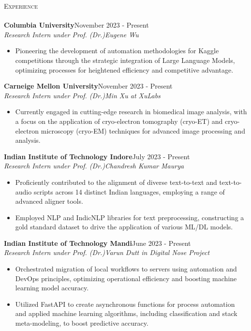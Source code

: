 \documentclass[a4paper]{article}
\newcommand{\lineunder} {
    \vspace*{-8pt} \\
    \hspace*{-18pt} \hrulefill \\
}
\newcommand{\header} [1] {
    {\hspace*{-18pt}\vspace*{6pt} \textsc{#1}}
    \vspace*{-6pt} \lineunder
}
\begin{document}
\header{Experience}
\vspace{-1mm}
{\textbf{Columbia University}}\hfill November 2023 - Present \\
 {\textit{Research Intern under Prof. (Dr.)Eugene Wu }}  \
\vspace{-2mm}
\begin{itemize} 
\item Pioneering the development of automation methodologies for Kaggle competitions through the strategic integration of Large Language Models, optimizing processes for heightened efficiency and competitive advantage.
\end{itemize}
\vspace{-1.5mm}
{\textbf{Carneige Mellon University}}\hfill November 2023 - Present \\
 {\textit{Research Intern under Prof. (Dr.)Min Xu at XuLabs}}  \
\vspace{-2mm}
\begin{itemize} 
\item Currently engaged in cutting-edge research in biomedical image analysis, with a focus on the application of cryo-electron tomography (cryo-ET) and cryo-electron microscopy (cryo-EM) techniques for advanced image processing and analysis.
\end{itemize}
\vspace{-2mm}
{\textbf{Indian Institute of Technology Indore}}\hfill July 2023 - Present \\
 {\textit{Research Intern under Prof. (Dr.)Chandresh Kumar Maurya }}  \
\vspace{-2mm}
\begin{itemize} 
\item Proficiently contributed to the alignment of diverse text-to-text and text-to-audio scripts across 14 distinct Indian languages, employing a range of advanced aligner tools.  
\vspace{-2.5mm}
\item Employed NLP and IndicNLP libraries for text preprocessing, constructing a gold standard dataset to drive the application of various ML/DL models.
\end{itemize}
\vspace{-1.5mm}
{\textbf{Indian Institute of Technology Mandi}}\hfill June 2023 - Present \\
 {\textit{Research Intern under Prof. (Dr.)Varun Dutt in Digital Nose Project}}  \
\vspace{-2mm}
\begin{itemize} 
\item Orchestrated migration of local workflows to servers using automation and DevOps principles, optimizing operational efficiency and boosting machine learning model accuracy. 
\vspace{-2mm}
\item Utilized FastAPI to create asynchronous functions for process automation and applied machine learning algorithms, including classification and stack meta-modeling, to boost predictive accuracy.
\end{itemize}
\end{document}
